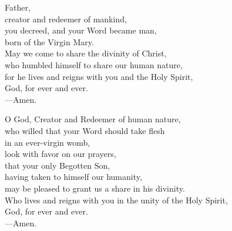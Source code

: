 \prayer


\begin{prayerverse}
Father,\\
creator and redeemer of mankind,\\
you decreed, and your Word became man,\\
born of the Virgin Mary.\\
May we come to share the divinity of Christ,\\
who humbled himself to share our human nature,\\
for he lives and reigns with you and the Holy Spirit,\\
God, for ever and ever.\\
{\color{red}---\thinspace}Amen.
\end{prayerverse}


\begin{prayerverse}
O God, Creator and Redeemer of human nature,\\
who willed that your Word should take flesh\\
in an ever-virgin womb,\\
look with favor on our prayers,\\
that your only Begotten Son,\\
having taken to himself our humanity,\\
may be pleased to grant us a share in his divinity.\\
Who lives and reigns with you in the unity of the Holy Spirit,\\
God, for ever and ever.\\
{\color{red}---\thinspace}Amen.

\end{prayerverse}

